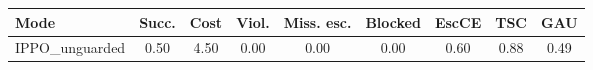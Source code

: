 \begin{tabular}{lcccccccc}
\toprule
\textbf{Mode} & \textbf{Succ.} & \textbf{Cost} & \textbf{Viol.} & \textbf{Miss. esc.} & \textbf{Blocked} & \textbf{EscCE} & \textbf{TSC} & \textbf{GAU} \\
\midrule
IPPO_unguarded & 0.50 & 4.50 & 0.00 & 0.00 & 0.00 & 0.60 & 0.88 & 0.49 \\
\bottomrule
\end{tabular}
